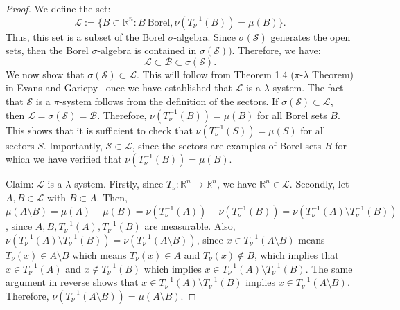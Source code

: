 \documentclass{amsart}
\theoremstyle{lemma}
\theoremstyle{remark}
\begin{document}
\begin{proof}
We define the set:
\begin{equation}
\mathcal{L} := \{ B \subset \mathbb{R}^n : B \ \text{Borel}, \nu(T_{\nu}^{-1}(B)) = \mu(B)\}.
\end{equation}
Thus, this set is a subset of the Borel $\sigma$-algebra. Since $\sigma(\mathcal{S})$ generates the open sets, then the Borel $\sigma$-algebra is contained in $\sigma(\mathcal{S}))$. Therefore, we have:
\begin{equation}
\mathcal{L} \subset \mathcal{B} \subset \sigma(\mathcal{S}).
\end{equation}
We now show that $\sigma(\mathcal{S}) \subset \mathcal{L}$. This will follow from Theorem 1.4 ($\pi$-$\lambda$ Theorem) in Evans and Gariepy~\cite{evansgariepy} once we have established that $\mathcal{L}$ is a $\lambda$-system. The fact that $\mathcal{S}$ is a $\pi$-system follows from the definition of the sectors. If $\sigma(\mathcal{S}) \subset \mathcal{L}$, then $\mathcal{L} = \sigma(\mathcal{S}) = \mathcal{B}$. Therefore, $\nu(T_{\nu}^{-1}(B)) = \mu(B)$ for all Borel sets $B$. This shows that it is sufficient to check that $\nu(T_{\nu}^{-1}(S)) = \mu(S)$ for all sectors $S$. Importantly, $\mathcal{S} \subset \mathcal{L}$, since the sectors are examples of Borel sets $B$ for which we have verified that $\nu(T_{\nu}^{-1}(B)) = \mu(B)$.

Claim: $\mathcal{L}$ is a $\lambda$-system. Firstly, since $T_{\nu}:\mathbb{R}^n \rightarrow \mathbb{R}^n$, we have $\mathbb{R}^n \in \mathcal{L}$. Secondly, let $A, B \in \mathcal{L}$ with $B \subset A$. Then, $\mu(A \setminus B) = \mu(A) - \mu(B) = \nu(T_{\nu}^{-1}(A)) - \nu(T_{\nu}^{-1}(B)) = \nu(T_{\nu}^{-1}(A) \setminus T_{\nu}^{-1}(B))$, since $A, B, T_{\nu}^{-1}(A), T_{\nu}^{-1}(B)$ are measurable. Also, $\nu(T_{\nu}^{-1}(A) \setminus T_{\nu}^{-1}(B))= \nu(T_{\nu}^{-1}(A \setminus B))$, since $x \in T_{\nu}^{-1}(A \setminus B)$ means $T_{\nu}(x) \in A \setminus B$ which means $T_{\nu}(x) \in A$ and $T_{\nu}(x) \notin B$, which implies that $x \in T_{\nu}^{-1}(A)$ and $x \notin T_{\nu}^{-1}(B)$ which implies $x \in T_{\nu}^{-1}(A) \setminus T_{\nu}^{-1}(B)$. The same argument in reverse shows that $x \in T_{\nu}^{-1}(A) \setminus T_{\nu}^{-1}(B)$ implies $x \in T_{\nu}^{-1}(A \setminus B)$. Therefore, $\nu(T_{\nu}^{-1}(A \setminus B)) = \mu(A \setminus B)$.


\end{proof}
\end{document}
